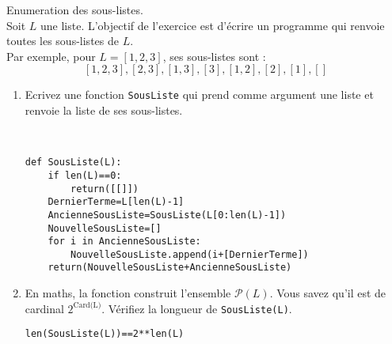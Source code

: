 \begin{exercice}Enumeration des sous-listes.\\
Soit $L$ une liste. L'objectif de l'exercice est d'écrire un programme qui renvoie toutes les sous-listes de $L$.\\
Par exemple, pour $L=[1,2,3]$, ses sous-listes sont : 
\[[1, 2, 3], [2, 3], [1, 3], [3], [1, 2], [2], [1], []\]
\begin{enumerate}
\item Ecrivez une fonction \verb?SousListe? qui prend comme argument une liste et renvoie la liste de ses sous-listes.
\begin{solution}~\\
\vspace{-0.7cm}
\begin{verbatim}        
def SousListe(L):
    if len(L)==0:
        return([[]])
    DernierTerme=L[len(L)-1]
    AncienneSousListe=SousListe(L[0:len(L)-1])
    NouvelleSousListe=[]
    for i in AncienneSousListe:
        NouvelleSousListe.append(i+[DernierTerme])      
    return(NouvelleSousListe+AncienneSousListe) 
\end{verbatim}
\end{solution}
\item En maths, la fonction construit l'ensemble $\mathcal{P}(L)$. Vous savez qu'il est de cardinal $2^\text{Card(L)}$. Vérifiez la longueur de \verb?SousListe(L)?.
\begin{solution}
\verb?len(SousListe(L))==2**len(L)?
\end{solution}
\end{enumerate}
\end{exercice}
      
        






%



